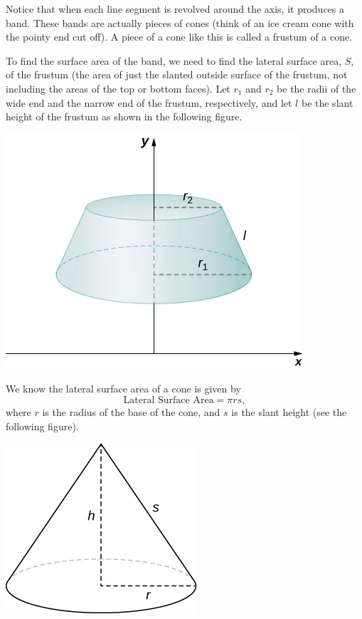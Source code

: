 \documentclass{report}
\begin{document}
    \pagebreak \bigbreak \noindent 
    Notice that when each line segment is revolved around the axis, it produces a band. These bands are actually pieces of cones (think of an ice cream cone with the pointy end cut off). A piece of a cone like this is called a frustum of a cone.
    \bigbreak \noindent 
    \begin{minipage}[]{0.47\textwidth}
        To find the surface area of the band, we need to find the lateral surface area, $S$, of the frustum (the area of just the slanted outside surface of the frustum, not including the areas of the top or bottom faces). Let $r_1$ and $r_2$ be the radii of the wide end and the narrow end of the frustum, respectively, and let $l$ be the slant height of the frustum as shown in the following figure.
    \end{minipage}
    \begin{minipage}[]{0.47\textwidth}
        \includegraphics[scale=0.5]{./figures/graph33.png}
    \end{minipage}
    \bigbreak \noindent 
    \begin{minipage}[]{0.47\textwidth}
        We know the lateral surface area of a cone is given by
    \[ \text{Lateral Surface Area} = \pi rs, \]
    where \( r \) is the radius of the base of the cone, and \( s \) is the slant height (see the following figure).
    \end{minipage}
    \begin{minipage}[]{0.42\textwidth}
        \begin{center}
            \includegraphics[scale=0.5]{./figures/graph34.png}
        \end{center}
    \end{minipage}
\end{document}
